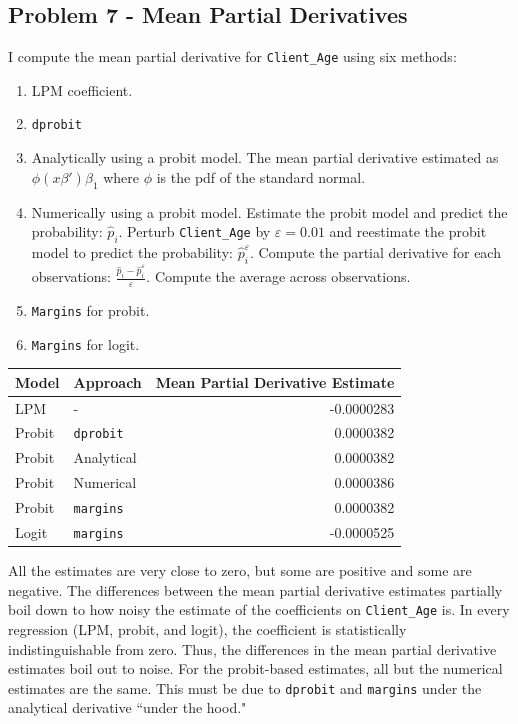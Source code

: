 \documentclass{article}
\begin{document}
\pagebreak

\subsection*{Problem 7 - Mean Partial Derivatives}

I compute the mean partial derivative for \texttt{Client\_Age} using six methods:

\begin{enumerate}
\item LPM coefficient.
\item \texttt{dprobit}
\item Analytically using a probit model. The mean partial derivative estimated as $\phi(x \beta') \beta_1$ where $\phi$ is the pdf of the standard normal.
\item Numerically using a probit model.  Estimate the probit model and predict the probability: $\hat{p}_i$.  Perturb \texttt{Client\_Age} by $\varepsilon = 0.01$ and reestimate the probit model to predict the probability: $\hat{p}^\varepsilon_i$. Compute the partial derivative for each observations: $\frac{\hat{p}_i - \hat{p}^\varepsilon_i}{\varepsilon}$. Compute the average across observations.
\item \texttt{Margins} for probit.
\item \texttt{Margins} for logit.
\end{enumerate}

\bigskip

\begin{center}
\begin{tabular}{ l l | r }
Model & Approach & Mean Partial Derivative Estimate\\ 
\hline
 LPM    & -                & -0.0000283 \\  
 Probit & \texttt{dprobit} &  0.0000382 \\
 Probit & Analytical       &  0.0000382 \\
 Probit & Numerical        &  0.0000386  \\
 Probit & \texttt{margins} &  0.0000382 \\
 Logit  & \texttt{margins} & -0.0000525
\end{tabular}
\end{center}

\bigskip

All the estimates are very close to zero, but some are positive and some are negative.  The differences between the mean partial derivative estimates partially boil down to how noisy the estimate of the coefficients on \texttt{Client\_Age} is.  In every regression (LPM, probit, and logit), the coefficient is statistically indistinguishable from zero.  Thus, the differences in the mean partial derivative estimates boil out to noise.  For the probit-based estimates, all but the numerical estimates are the same.  This must be due to \texttt{dprobit} and \texttt{margins} under the analytical derivative ``under the hood."
\end{document}
